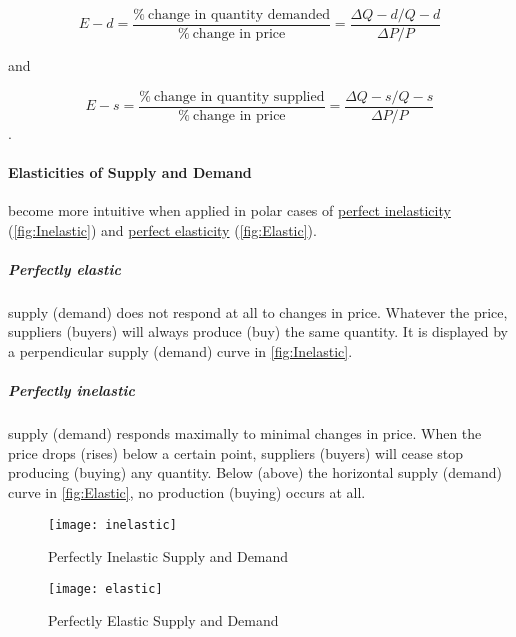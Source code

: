	\begin{equation} \label{eq:PED}
			E-{d}=\frac{\%\ \mbox{change in quantity demanded}}{\%\ \mbox{change in price}}=\frac{\Delta Q-{d}/{Q-{d}}}{{\Delta P}/{P}}
	\end{equation}

 and

 	\begin{equation} \label{eq:PES}
			E-{s}=\frac{\%\ \mbox{change in quantity supplied}}{\%\ \mbox{change in price}}=\frac{\Delta Q-{s}/{Q-{s}}}{{\Delta P}/{P}}
	\end{equation}.

\paragraph{Elasticities of Supply and Demand}
become more intuitive when applied in polar cases of \href{fig:Inelastic}{perfect inelasticity} (\autoref{fig:Inelastic}) and \href{fig:Elastic}{perfect elasticity} (\autoref{fig:Elastic}).


\subparagraph{Perfectly elastic}
supply (demand) does not respond at all to changes in price.
Whatever the price, suppliers (buyers) will always produce (buy) the same quantity.
It is displayed by a perpendicular supply (demand) curve in \autoref{fig:Inelastic}.

\subparagraph{Perfectly inelastic}
supply (demand) responds maximally to minimal changes in price.
When the price drops (rises) below a certain point, suppliers (buyers) will cease stop producing (buying) any quantity.
Below (above) the horizontal supply (demand) curve in \autoref{fig:Elastic}, no production (buying) occurs at all.

 \begin{figure}[htbp]
	\centering
	\texttt{[image: inelastic]}
	\caption{Perfectly Inelastic Supply and Demand}
	\label{fig:Inelastic}
\end{figure}

 \begin{figure}[htbp]
	\centering
	\texttt{[image: elastic]}
	\caption{Perfectly Elastic Supply and Demand}
	\label{fig:Elastic}
\end{figure}


